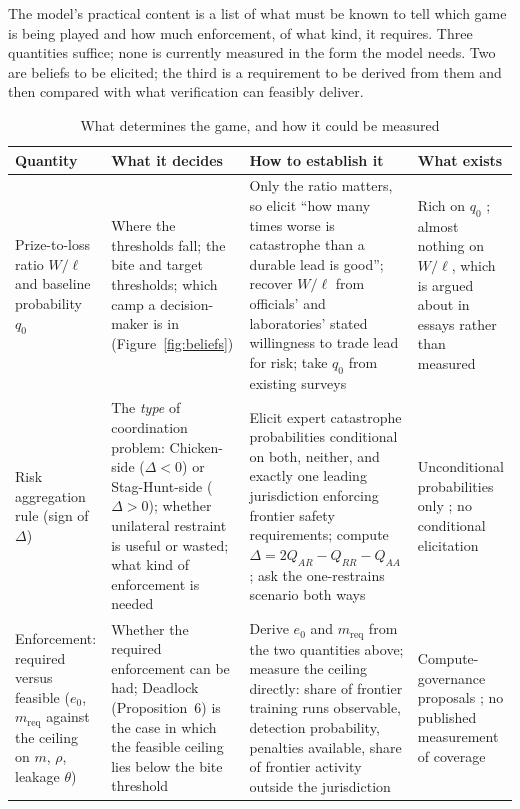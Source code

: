 \documentclass[11pt]{article}
\theoremstyle{plain}
\theoremstyle{definition}
\theoremstyle{remark}
\newcommand{\Delt}{\Delta}
\begin{document}
The model's practical content is a list of what must be known to tell which game is being played and how much enforcement, of what kind, it requires. Three quantities suffice; none is currently measured in the form the model needs. Two are beliefs to be elicited; the third is a requirement to be derived from them and then compared with what verification can feasibly deliver.

\begin{table}[!htb]
\centering\small
\caption{What determines the game, and how it could be measured}
\label{tab:measure}
\begin{tabular}{@{}>{\raggedright\arraybackslash}p{3.0cm}>{\raggedright\arraybackslash}p{3.5cm}>{\raggedright\arraybackslash}p{4.6cm}>{\raggedright\arraybackslash}p{3.5cm}@{}}
\toprule
Quantity & What it decides & How to establish it & What exists \\
\midrule
Prize-to-loss ratio $W/\ell$ and baseline probability $q_0$ & Where the thresholds fall; the bite and target thresholds; which camp a decision-maker is in (Figure~\ref{fig:beliefs}) & Only the ratio matters, so elicit ``how many times worse is catastrophe than a durable lead is good''; recover $W/\ell$ from officials' and laboratories' stated willingness to trade lead for risk; take $q_0$ from existing surveys & Rich on $q_0$ \citep{grace2024}; almost nothing on $W/\ell$, which is argued about in essays rather than measured \\
\addlinespace
Risk aggregation rule (sign of $\Delt$) & The \emph{type} of coordination problem: Chicken-side ($\Delt<0$) or Stag-Hunt-side ($\Delt>0$); whether unilateral restraint is useful or wasted; what kind of enforcement is needed & Elicit expert catastrophe probabilities conditional on both, neither, and exactly one leading jurisdiction enforcing frontier safety requirements; compute $\Delt=2Q_{AR}-Q_{RR}-Q_{AA}$; ask the one-restrains scenario both ways & Unconditional probabilities only \citep{grace2024}; no conditional elicitation \\
\addlinespace
Enforcement: required versus feasible ($e_0$, $m_{\mathrm{req}}$ against the ceiling on $m$, $\rho$, leakage $\theta$) & Whether the required enforcement can be had; Deadlock (Proposition~6) is the case in which the feasible ceiling lies below the bite threshold & Derive $e_0$ and $m_{\mathrm{req}}$ from the two quantities above; measure the ceiling directly: share of frontier training runs observable, detection probability, penalties available, share of frontier activity outside the jurisdiction & Compute-governance proposals \citep{sastry2024,shavit2023}; no published measurement of coverage \\
\bottomrule\end{tabular}
\end{table}
\end{document}
